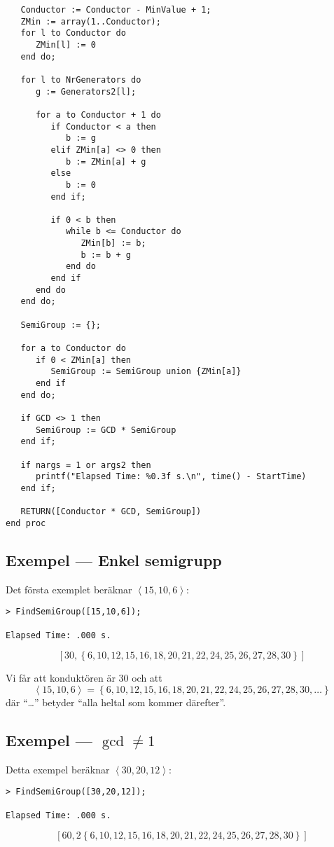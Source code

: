 \begin{verbatim}
   Conductor := Conductor - MinValue + 1;
   ZMin := array(1..Conductor);
   for l to Conductor do
      ZMin[l] := 0
   end do;

   for l to NrGenerators do
      g := Generators2[l];

      for a to Conductor + 1 do
         if Conductor < a then
            b := g
         elif ZMin[a] <> 0 then
            b := ZMin[a] + g
         else
            b := 0
         end if;

         if 0 < b then
            while b <= Conductor do
               ZMin[b] := b;
               b := b + g
            end do
         end if
      end do
   end do;

   SemiGroup := {};

   for a to Conductor do
      if 0 < ZMin[a] then
         SemiGroup := SemiGroup union {ZMin[a]}
      end if
   end do;

   if GCD <> 1 then
      SemiGroup := GCD * SemiGroup
   end if;

   if nargs = 1 or args2 then
      printf("Elapsed Time: %0.3f s.\n", time() - StartTime)
   end if;

   RETURN([Conductor * GCD, SemiGroup])
end proc
\end{verbatim}

\subsection{Exempel --- Enkel semigrupp}

Det första exemplet beräknar $\left<15, 10, 6\right>$:

\begin{verbatim}
> FindSemiGroup([15,10,6]);

Elapsed Time: .000 s.
\end{verbatim}
\[\left[30, \left\{6, 10, 12, 15, 16, 18, 20, 21, 22, 24, 25, 26, 27, 28, 30\right\}\right]\]

Vi får att konduktören är $30$ och att 
\[\left<15, 10, 6\right> = \left\{6, 10, 12, 15, 16, 18, 20, 21, 22, 24, 25, 26, 27, 28, 30, \ldots\right\}\]
där ``\ldots'' betyder ``alla heltal som kommer därefter''.

\subsection{Exempel --- $\gcd \neq 1$}

Detta exempel beräknar $\left<30, 20, 12\right>$:

\begin{verbatim}
> FindSemiGroup([30,20,12]);

Elapsed Time: .000 s.
\end{verbatim}
\[\left[60, 2 \left\{6, 10, 12, 15, 16, 18, 20, 21, 22, 24, 25, 26, 27, 28, 30\right\}\right]\]

